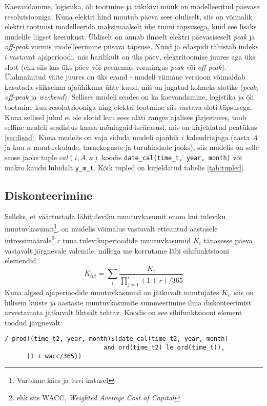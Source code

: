 \documentclass[10pt,a4paper]{article}
\begin{document}
Kaevandamine, logistika, õli tootmine ja tükikivi müük on modelleeritud päevase resolutsiooniga. Kuna elektri hind muutub päeva sees oluliselt, siis on võimalik elektri tootmist modelleerida maksimaalselt ühe tunni täpsusega, kuid see lisaks mudelile liigset keerukust. Üldiselt on annab ilmselt elektri  päevasiseselt \emph{peak} ja \emph{off-peak} vormis modelleerimine piisava täpsuse. Nüüd ja edas\-pidi tähistab indeks $i$ vastavat ajaperioodi, mis harilikult on üks päev, elektritoomise juures aga üks slott (ehk siis kas üks päev või peenemas vormingus \emph{peak} või \emph{off-peak}).
Ülalmainitud väite juures on üks erand - mudeli viimane versioon võimaldab kasutada väikseima ajaühikuna  ühte kuud, mis on jagatud kolmeks slotiks (\emph{peak}, \emph{off-peak} ja \emph{weekend}). Sellises mudeli seades on ka kaevandamine, logistika ja õli tootmine kuu resolutsiooniga ning elektri tootmine siis vastava sloti täpsusega. Kuna sellisel juhul ei ole slotid kuu sees alati ranges ajalises järjestuses, toob selline mudeli seadistus kaasa mõningaid iseärasusi, mis on kirjeldatud peatükus \ref{sec:lisad}. Kuna mudelis on vaja siduda mudeli ajaühik $i$ kalendriajaga (aasta $A$ ja kuu $\kappa$ muutuvkulude, tarnekoguste ja turuhindade jaoks), siis mudelis on selle seose jaoks tuple $cal(i, A, \kappa)$ koodis \texttt{date\_cal(time\_t, year, month)} või makro kaudu lühidalt \texttt{y\_m\_t}. Kõik tupled on kirjeldatud tabelis \ref{tab:tupled}.

\subsection{Diskonteerimine}
Selleks, et väärtustada lähituleviku muutuvkasumit enam kui tuleviku muutuvkasumit\footnote{Varblane käes ja tuvi katusel}, on mudelis võimalus vastavalt etteantud aastasele intressimäärale\footnote{ehk siis WACC, \emph{Weighted Average Cost of Capital}} $r$ tuua tulevikuperioodide muutuvkasumid $K_i$ tänasesse päeva vastavalt järgnevale valemile, millega me korrutame läbi sihifunktsiooni elemendid.
\begin{equation}
K_{tot} = \sum_i \frac{K_i}{\prod_{j=1}^i(1+r)/365}
\end{equation}
Kuna algsed ajaperioodide muutuvkasumid on jätkuvalt muutujates $K_i$, siis on hilisem kuiste ja aastaste muutuvkasumite summeerimine ilma diskonteerimist arvestamata jätkuvalt lihtsalt tehtav.
Koodis on see sihifunktsiooni element toodud järgnevalt:
\begin{verbatim}
/ prod((time_t2, year, month)$(date_cal(time_t2, year, month)
                           and ord(time_t2) le ord(time_t)),
      (1 + wacc/365))
\end{verbatim}
\end{document}
